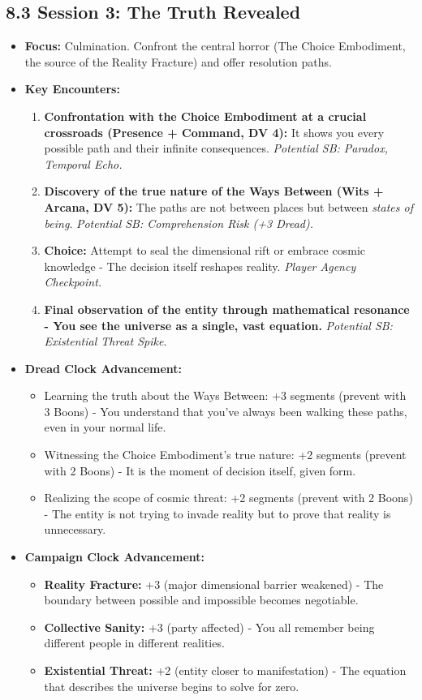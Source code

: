 \documentclass[11pt]{article}
\begin{document}
\subsection*{8.3 Session 3: The Truth Revealed}

\begin{itemize}
\item \textbf{Focus:} Culmination. Confront the central horror (The Choice Embodiment, the source of the Reality Fracture) and offer resolution paths.
\item \textbf{Key Encounters:}
\begin{enumerate}
\item \textbf{Confrontation with the Choice Embodiment at a crucial crossroads (Presence + Command, DV 4):} It shows you every possible path and their infinite consequences. \textit{Potential SB: Paradox, Temporal Echo.}
\item \textbf{Discovery of the true nature of the Ways Between (Wits + Arcana, DV 5):} The paths are not between places but between \textit{states of being}. \textit{Potential SB: Comprehension Risk (+3 Dread).}
\item \textbf{Choice:} Attempt to seal the dimensional rift or embrace cosmic knowledge - The decision itself reshapes reality. \textit{Player Agency Checkpoint.}
\item \textbf{Final observation of the entity through mathematical resonance - You see the universe as a single, vast equation.} \textit{Potential SB: Existential Threat Spike.}
\end{enumerate}
\item \textbf{Dread Clock Advancement:}
\begin{itemize}
\item Learning the truth about the Ways Between: +3 segments (prevent with 3 Boons) - You understand that you've always been walking these paths, even in your normal life.
\item Witnessing the Choice Embodiment's true nature: +2 segments (prevent with 2 Boons) - It is the moment of decision itself, given form.
\item Realizing the scope of cosmic threat: +2 segments (prevent with 2 Boons) - The entity is not trying to invade reality but to prove that reality is unnecessary.
\end{itemize}
\item \textbf{Campaign Clock Advancement:}
\begin{itemize}
\item \textbf{Reality Fracture:} +3 (major dimensional barrier weakened) - The boundary between possible and impossible becomes negotiable.
\item \textbf{Collective Sanity:} +3 (party affected) - You all remember being different people in different realities.
\item \textbf{Existential Threat:} +2 (entity closer to manifestation) - The equation that describes the universe begins to solve for zero.
\end{itemize}
\end{itemize}
\end{document}
